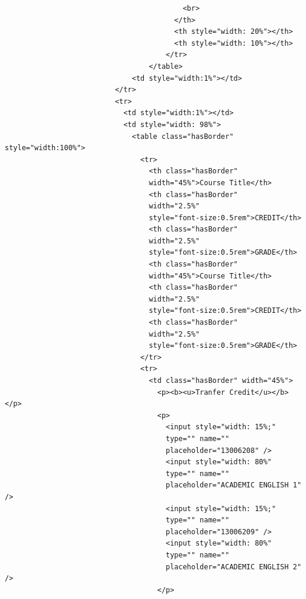 \documentclass[12pt]{report} %
\begin{document}
\begin{verbatim}
                                          <br>
                                        </th>
                                        <th style="width: 20%"></th>
                                        <th style="width: 10%"></th>
                                      </tr>
                                  </table>
                              <td style="width:1%"></td>
                          </tr>
                          <tr>
                            <td style="width:1%"></td>
                            <td style="width: 98%">
                              <table class="hasBorder" style="width:100%">
                                <tr>
                                  <th class="hasBorder"
                                  width="45%">Course Title</th>
                                  <th class="hasBorder"
                                  width="2.5%"
                                  style="font-size:0.5rem">CREDIT</th>
                                  <th class="hasBorder"
                                  width="2.5%"
                                  style="font-size:0.5rem">GRADE</th>
                                  <th class="hasBorder"
                                  width="45%">Course Title</th>
                                  <th class="hasBorder"
                                  width="2.5%"
                                  style="font-size:0.5rem">CREDIT</th>
                                  <th class="hasBorder"
                                  width="2.5%"
                                  style="font-size:0.5rem">GRADE</th>
                                </tr>
                                <tr>
                                  <td class="hasBorder" width="45%">
                                    <p><b><u>Tranfer Credit</u></b></p>
                                    <p>
                                      <input style="width: 15%;"
                                      type="" name=""
                                      placeholder="13006208" />
                                      <input style="width: 80%"
                                      type="" name=""
                                      placeholder="ACADEMIC ENGLISH 1" />
                                      <input style="width: 15%;"
                                      type="" name=""
                                      placeholder="13006209" />
                                      <input style="width: 80%"
                                      type="" name=""
                                      placeholder="ACADEMIC ENGLISH 2" />
                                    </p>

\end{verbatim}
\end{document}
